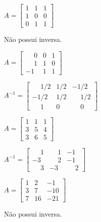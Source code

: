 \documentclass[12pt]{exam}
\begin{document}
\begin{exercicio}
    $
    A = \begin{bmatrix}
        1 & 1 & 1\\
        1 & 0 & 0\\
        0 & 1 & 1
    \end{bmatrix}
    $
    \begin{solucao}
        Não possui inversa.
    \end{solucao}
\end{exercicio}

\begin{exercicio}
    $
    A = \begin{bmatrix}
        \phantom{-}0 & 0 & 1\\
        \phantom{-}1 & 1 & 0\\
        -1 & 1 & 1
    \end{bmatrix}
    $
    \begin{solucao}
        $
            A^{-1} = \begin{bmatrix}
                \phantom{-}1/2 & 1/2 & -1/2\\
                -1/2 & 1/2 & \phantom{-}1/2\\
                \phantom{-}1 & 0 & \phantom{-}0
            \end{bmatrix}
        $
    \end{solucao}
\end{exercicio}


\begin{exercicio}
    $
        A =\begin{bmatrix}
            1 & 1 & 1\\
            3 & 5 & 4\\
            3 & 6 & 5
        \end{bmatrix}
    $
    \begin{solucao}
        $
            A^{-1} =\begin{bmatrix}
                \phantom{-} 1 & \phantom{-} 1 & -1\\
                -3 & \phantom{-} 2 & -1\\
                \phantom{-} 3 & -3 & \phantom{-} 2
            \end{bmatrix}
        $
    \end{solucao}
\end{exercicio}

\begin{exercicio}
  $
    A =\begin{bmatrix}
        1 & 2 & -1\\
        3 & 7 & -10\\
        7 & 16 & -21
    \end{bmatrix}
  $
  \begin{solucao}
    Não possui inversa.
  \end{solucao}
\end{exercicio}
\end{document}
